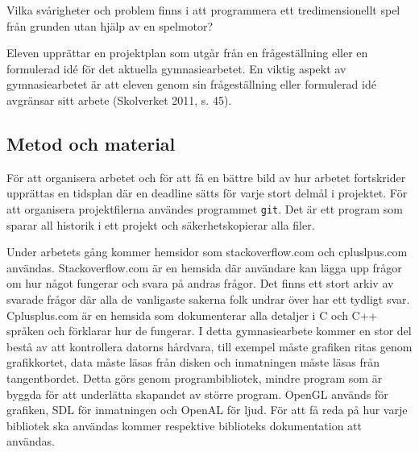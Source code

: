 \documentclass[12pt, a4paper]{article}
\newcommand{\code}{\texttt}
\begin{document}
	\begin{center}
		Vilka svårigheter och problem finns i att programmera ett tredimensionellt spel från grunden utan hjälp av en spelmotor?
	\end{center}
	
	\begin{small}
		Eleven upprättar en projektplan som utgår från en frågeställning eller en
formulerad idé för det aktuella gymnasiearbetet. En viktig aspekt av
gymnasiearbetet är att eleven genom sin frågeställning eller formulerad idé
avgränsar sitt arbete (Skolverket 2011, s. 45).
	\end{small}
	
	\subsection{Metod och material}
	
	För att organisera arbetet och för att få en bättre bild av hur arbetet fortskrider upprättas en tidsplan där en deadline sätts för varje stort delmål i projektet. För att organisera projektfilerna användes programmet \code{git}. Det är ett program som sparar all historik i ett projekt och säkerhetskopierar alla filer. 
	
	Under arbetets gång kommer hemsidor som stackoverflow.com och cpluslpus.com användas. Stackoverflow.com är en hemsida där användare kan lägga upp frågor om hur något fungerar och svara på andras frågor. Det finns ett stort arkiv av svarade frågor där alla de vanligaste sakerna folk undrar över har ett tydligt svar. Cplusplus.com är en hemsida som dokumenterar alla detaljer i C och C++ språken och förklarar hur de fungerar. I detta gymnasiearbete kommer en stor del bestå av att kontrollera datorns hårdvara, till exempel måste grafiken ritas genom grafikkortet, data måste läsas från disken och inmatningen måste läsas från tangentbordet. Detta görs genom programbibliotek, mindre program som är byggda för att underlätta skapandet av större program. OpenGL används för grafiken, SDL för inmatningen och OpenAL för ljud. För att få reda på hur varje bibliotek ska användas kommer respektive biblioteks dokumentation att användas. 
	
\end{document}
